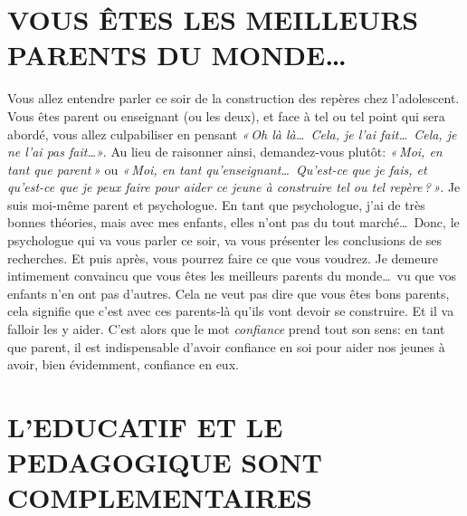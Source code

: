 \documentclass[11pt]{article} %
\begin{document}
\section{VOUS ÊTES LES MEILLEURS PARENTS DU MONDE\dots}

  Vous allez entendre parler ce soir de la construction des repères chez l'adolescent. Vous êtes parent ou enseignant (ou les deux), et face à tel ou tel point qui sera abordé, vous allez culpabiliser en pensant \textit{« Oh là là\dots\ Cela, je l'ai fait\dots\ Cela, je ne l'ai pas fait\dots »}. Au lieu de raisonner ainsi, demandez-vous plutôt: \textit{« Moi, en tant que parent »} ou \textit{« Moi, en tant qu'enseignant\dots\ Qu'est-ce que je fais, et qu'est-ce que je peux faire pour aider ce jeune à construire tel ou tel repère ? »}.\newline
  Je suis moi-même parent et psychologue. En tant que psychologue, j'ai de très bonnes théories, mais avec mes enfants, elles n'ont pas du tout marché\dots\ Donc, le psychologue qui va vous parler ce soir, va vous présenter les conclusions de ses recherches. Et puis après, vous pourrez faire ce que vous voudrez. Je demeure intimement convaincu que vous êtes les meilleurs parents du monde\dots\ vu que vos enfants n'en ont pas d'autres. Cela ne veut pas dire que vous êtes bons parents, cela signifie que c'est avec ces parents-là qu'ils vont devoir se construire. Et il va falloir les y aider. C'est alors que le mot \textit{confiance }prend tout son sens: en tant que parent, il est indispensable d'avoir confiance en soi pour aider nos jeunes à avoir, bien évidemment, confiance en eux.


\section{L'EDUCATIF ET LE PEDAGOGIQUE SONT COMPLEMENTAIRES}
\end{document}
